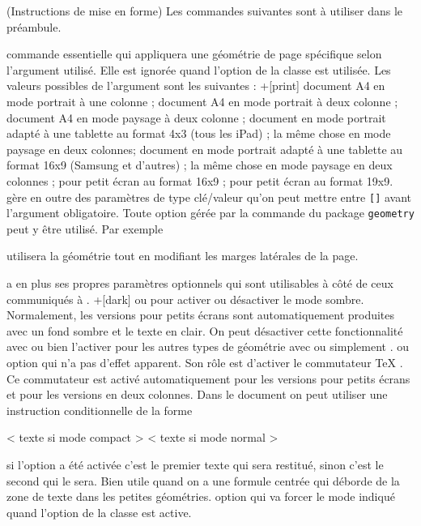 \documentclass[11pt,report,oneside,solution]{cpgedev}
\let\CMD\cmd
\renewcommand\cmd[1]{{\spotcolor\CMD{#1}}}
\let\OPT\opt
\renewcommand\opt[1]{{\spotcolor\OPT{#1}}}
\def\CMDitem#1{\cmditem{\spotcolor #1}\leavevmode\linebreak}
\begin{document}
\partie(Instructions de mise en forme)
Les commandes suivantes sont à utiliser dans le préambule. 
\begin{ltxsyntax}
     \CMDitem{cpgegeometry{}}
          commande essentielle qui appliquera une géométrie de page spécifique selon l'argument utilisé. Elle est ignorée quand l'option  de la classe est utilisée. Les valeurs possibles de l'argument sont les suivantes :
          \xopt+[print] 
               document A4 en mode portrait à une colonne ;
          \xopt[2print] 
               document A4 en mode portrait à deux colonne ;
          \xopt[lsprint] 
               document A4 en mode paysage à deux colonne ;
          \xopt[tablet] 
               document en mode portrait adapté à une tablette au format 4x3 (tous les iPad) ;
          \xopt[lstablet] 
               la même chose en mode paysage en deux colonnes;
          \xopt[alttablet] 
               document en mode portrait adapté à une tablette au format 16x9 (Samsung et d'autres) ;
          \xopt[alttablet] 
               la même chose en mode paysage en deux colonnes ;
          \xopt[phone] 
               pour petit écran au format 16x9 ;
          \xopt[altphone] 
               pour petit écran au format 19x9.
          \exit 
{} gère en outre des paramètres de type  clé/valeur qu'on peut mettre entre \verb+[]+ avant l'argument obligatoire. Toute option gérée par la commande  du package \texttt{geometry} peut y être utilisé. Par exemple 
\begin{latex}[]
\end{latex}
utilisera la géométrie  tout en modifiant les marges latérales de la page.

 a en plus ses propres paramètres optionnels qui sont utilisables à côté de ceux communiqués à . 
\xopt+[dark] 
     ou  pour activer ou désactiver le mode sombre. Normalement, les versions pour petits écrans sont automatiquement produites avec un fond sombre et le texte en clair. On peut désactiver cette fonctionnalité avec  ou bien l'activer pour les autres types de géométrie avec  ou simplement . 
 ou 
     option qui n'a pas d'effet apparent. Son rôle est d'activer le commutateur \TeX{} . Ce commutateur est activé automatiquement pour les versions pour petits écrans et pour les versions en deux colonnes. Dans le document on peut utiliser une instruction conditionnelle de la forme   
\begin{latex}[]
\ifcompact 
     < texte si mode compact >
\else 
     < texte si mode normal >
\fi 
\end{latex}
     si l'option  a été activée c'est le premier texte qui sera restitué, sinon c'est le second qui le sera. Bien utile quand on a une formule centrée qui déborde de la zone de texte dans les petites géométries. 
     option qui va forcer le mode indiqué quand l'option  de la classe est active. 
\exit   
\end{ltxsyntax}
\end{document}
